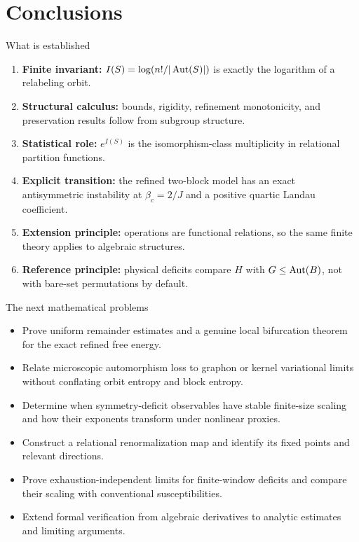\section{Conclusions}

\begin{frame}{What is established}
  \begin{enumerate}
    \item \textbf{Finite invariant:}
      $I(S)=\log(n!/|\operatorname{Aut}(S)|)$ is exactly the logarithm of a relabeling orbit.
    \item \textbf{Structural calculus:}
      bounds, rigidity, refinement monotonicity, and preservation results follow
      from subgroup structure.
    \item \textbf{Statistical role:}
      $e^{I(S)}$ is the isomorphism-class multiplicity in relational partition
      functions.
    \item \textbf{Explicit transition:}
      the refined two-block model has an exact antisymmetric instability at
      $\beta_c=2/J$ and a positive quartic Landau coefficient.
    \item \textbf{Extension principle:}
      operations are functional relations, so the same finite theory applies to
      algebraic structures.
    \item \textbf{Reference principle:}
      physical deficits compare $H$ with $G\leq\operatorname{Aut}(B)$, not with bare-set
      permutations by default.
  \end{enumerate}
\end{frame}

\begin{frame}{The next mathematical problems}
  \begin{itemize}
    \item Prove uniform remainder estimates and a genuine local bifurcation
      theorem for the exact refined free energy.
    \item Relate microscopic automorphism loss to graphon or kernel variational
      limits without conflating orbit entropy and block entropy.
    \item Determine when symmetry-deficit observables have stable finite-size
      scaling and how their exponents transform under nonlinear proxies.
    \item Construct a relational renormalization map and identify its fixed
      points and relevant directions.
    \item Prove exhaustion-independent limits for finite-window deficits and
      compare their scaling with conventional susceptibilities.
    \item Extend formal verification from algebraic derivatives to analytic
      estimates and limiting arguments.
  \end{itemize}
\end{frame}

